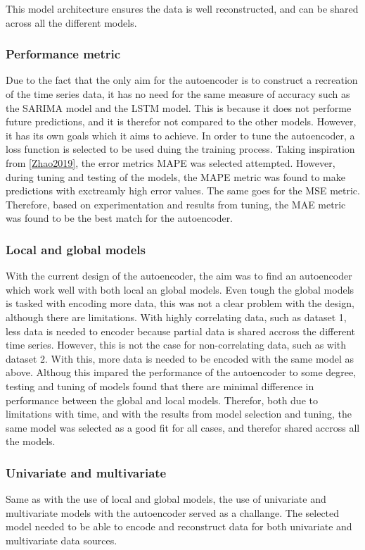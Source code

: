 This model architecture ensures the data is well reconstructed,
and can be shared across all the different models.



\subsubsection{Performance metric}
Due to the fact that the only aim for the autoencoder is to construct a recreation of the time series data,
it has no need for the same measure of accuracy such as the SARIMA model and the LSTM model.
This is because it does not performe future predictions, and it is therefor not compared to the other models.
However, it has its own goals which it aims to achieve.
In order to tune the autoencoder, a loss function is selected to be used duing the training process.
Taking inspiration from \cref{Zhao2019}, the error metrics MAPE was selected attempted.
However, during tuning and testing of the models, the MAPE metric was found to make predictions with exctreamly high error values.
The same goes for the MSE metric.
Therefore, based on experimentation and results from tuning,
the MAE metric was found to be the best match for the autoencoder.


\subsubsection{Local and global models}
With the current design of the autoencoder, the aim was to find an autoencoder which work well with both local an global models.
Even tough the global models is tasked with encoding more data, this was not a clear problem with the design, although there are limitations.
With highly correlating data, such as dataset 1, less data is needed to encoder because partial data is shared accross the different time series.
However, this is not the case for non-correlating data, such as with dataset 2.
With this, more data is needed to be encoded with the same model as above.
Althoug this impared the performance of the autoencoder to some degree, testing and tuning of models found that there are minimal difference in performance between the global and local models.
Therefor, both due to limitations with time, and with the results from model selection and tuning,
the same model was selected as a good fit for all cases, and therefor shared accross all the models.

\subsubsection{Univariate and multivariate}
Same as with the use of local and global models,
the use of univariate and multivariate models with the autoencoder served as a challange.
The selected model needed to be able to encode and reconstruct data for both univariate and multivariate data sources.

